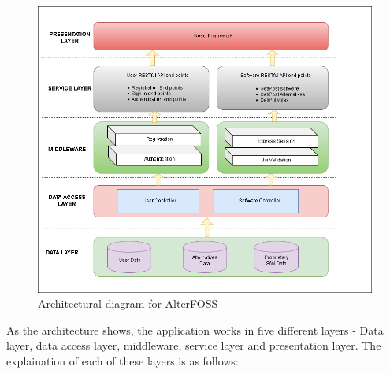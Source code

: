 \begin{center}
\begin{figure}[h!]
    \includegraphics[scale=0.5]{images/architecture.png}
    \caption{Architectural diagram for AlterFOSS}
    \label{fig:architecture}
\end{figure}
\end{center}


As the architecture shows, the application works in five different layers - Data layer, data access layer, middleware, service layer and presentation layer. The explaination of each of these layers is as follows:

